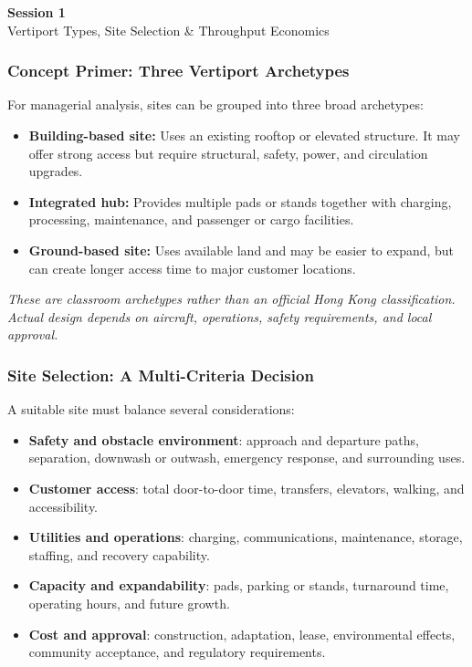 \documentclass{beamer}
\begin{document}
\begin{frame}[c]
  \begin{center}
    \huge\color{cuhkpurple}\textbf{Session 1}\\
    \vspace{0.5cm}
    \Large Vertiport Types, Site Selection \& Throughput Economics
  \end{center}
\end{frame}

\begin{frame}[t]
\frametitle{Concept Primer: Three Vertiport Archetypes}
For managerial analysis, sites can be grouped into three broad archetypes:
\begin{itemize}
\item \textbf{Building-based site:} Uses an existing rooftop or elevated structure. It may offer strong access but require structural, safety, power, and circulation upgrades.
\item \textbf{Integrated hub:} Provides multiple pads or stands together with charging, processing, maintenance, and passenger or cargo facilities.
\item \textbf{Ground-based site:} Uses available land and may be easier to expand, but can create longer access time to major customer locations.
\end{itemize}
\textit{These are classroom archetypes rather than an official Hong Kong classification. Actual design depends on aircraft, operations, safety requirements, and local approval.}
\end{frame}

\begin{frame}[t]
\frametitle{Site Selection: A Multi-Criteria Decision}
A suitable site must balance several considerations:
\begin{itemize}
\item \textbf{Safety and obstacle environment}: approach and departure paths, separation, downwash or outwash, emergency response, and surrounding uses.
\item \textbf{Customer access}: total door-to-door time, transfers, elevators, walking, and accessibility.
\item \textbf{Utilities and operations}: charging, communications, maintenance, storage, staffing, and recovery capability.
\item \textbf{Capacity and expandability}: pads, parking or stands, turnaround time, operating hours, and future growth.
\item \textbf{Cost and approval}: construction, adaptation, lease, environmental effects, community acceptance, and regulatory requirements.
\end{itemize}
\end{frame}
\end{document}
